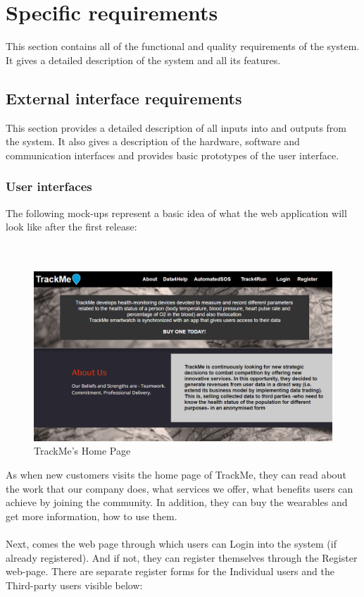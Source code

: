 \documentclass[12pt]{article}
\begin{document}
\section{Specific requirements}
This section contains all of the functional and quality requirements of the system. It gives a detailed
description of the system and all its features. 

\subsection{External interface requirements}
This section provides a detailed description of all inputs into and outputs from the system. It also gives a
description of the hardware, software and communication interfaces and provides basic prototypes of the
user interface.

\subsubsection{User interfaces}
The following mock-ups represent a basic idea of what the web application will look like after the first release:\\\\\\

\begin{figure}[H]
\centering
\includegraphics[scale=0.5]{../Assets/Home_Page.png}
\caption[UI: TrackMe's Home Page]{TrackMe's Home Page}
\label{fig:Home_Page}
\end{figure}

As when new customers visits the home page of TrackMe, they can read about the work that our company does, what services we offer, what benefits users can achieve by joining the community. In addition, they can buy the wearables and get more information, how to use them.\\\\
Next, comes the web page through which users can Login into the system (if already registered). And if not, they can register themselves through the Register web-page. There are separate register forms for the Individual users and the Third-party users visible below:\\\\
\end{document}
